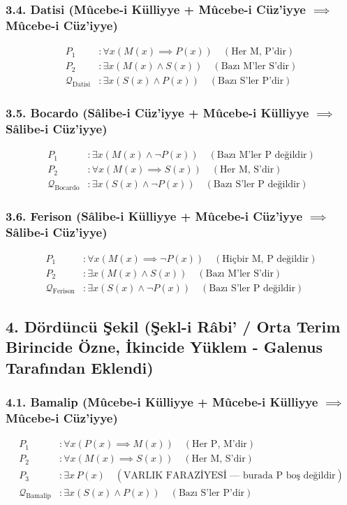 \documentclass[11pt, a4paper]{article}
\begin{document}
\subsubsection{3.4. Datisi (Mûcebe-i Külliyye + Mûcebe-i Cüz'iyye $\implies$ Mûcebe-i Cüz'iyye)}
\begin{align}
P_1 &: \forall x (M(x) \implies P(x)) \quad (\text{Her M, P'dir}) \\
P_2 &: \exists x (M(x) \land S(x)) \quad (\text{Bazı M'ler S'dir}) \\
\mathcal{Q}_{\text{Datisi}} &: \exists x (S(x) \land P(x)) \quad (\text{Bazı S'ler P'dir})
\end{align}

\subsubsection{3.5. Bocardo (Sâlibe-i Cüz'iyye + Mûcebe-i Külliyye $\implies$ Sâlibe-i Cüz'iyye)}
\begin{align}
P_1 &: \exists x (M(x) \land \neg P(x)) \quad (\text{Bazı M'ler P değildir}) \\
P_2 &: \forall x (M(x) \implies S(x)) \quad (\text{Her M, S'dir}) \\
\mathcal{Q}_{\text{Bocardo}} &: \exists x (S(x) \land \neg P(x)) \quad (\text{Bazı S'ler P değildir})
\end{align}

\subsubsection{3.6. Ferison (Sâlibe-i Külliyye + Mûcebe-i Cüz'iyye $\implies$ Sâlibe-i Cüz'iyye)}
\begin{align}
P_1 &: \forall x (M(x) \implies \neg P(x)) \quad (\text{Hiçbir M, P değildir}) \\
P_2 &: \exists x (M(x) \land S(x)) \quad (\text{Bazı M'ler S'dir}) \\
\mathcal{Q}_{\text{Ferison}} &: \exists x (S(x) \land \neg P(x)) \quad (\text{Bazı S'ler P değildir})
\end{align}

\subsection{4. Dördüncü Şekil (Şekl-i Râbi' / Orta Terim Birincide Özne, İkincide Yüklem - Galenus Tarafından Eklendi)}

\subsubsection{4.1. Bamalip (Mûcebe-i Külliyye + Mûcebe-i Külliyye $\implies$ Mûcebe-i Cüz'iyye)}
\begin{align}
P_1 &: \forall x (P(x) \implies M(x)) \quad (\text{Her P, M'dir}) \\
P_2 &: \forall x (M(x) \implies S(x)) \quad (\text{Her M, S'dir}) \\
P_3 &: \exists x \, P(x) \quad (\text{VARLIK FARAZİYESİ --- burada P boş değildir}) \\
\mathcal{Q}_{\text{Bamalip}} &: \exists x (S(x) \land P(x)) \quad (\text{Bazı S'ler P'dir})
\end{align}
\end{document}
